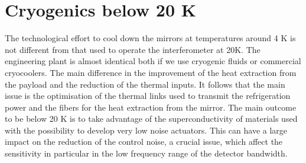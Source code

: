 \section{Cryogenics below 20 K}
The technological effort to cool down the mirrors at temperatures around 4 K   is not  different from that used to  operate the interferometer at 20K.
The engineering plant is  almost identical both if we use cryogenic fluids or commercial cryocoolers. The main difference in the improvement of the heat extraction from the payload and the reduction of the thermal inputs.
It follows that the main issue is the optimisation of the thermal links  used to transmit the refrigeration power and the fibers for the heat extraction from the mirror.
The main outcome to be below 20 K is to take advantage of the  superconductivity  of materials used with the possibility to develop  very low noise  actuators. 
This can have a large impact on the reduction of the control noise, a crucial issue, which affect the sensitivity  in particular in the low frequency range of the detector bandwidth.
 
